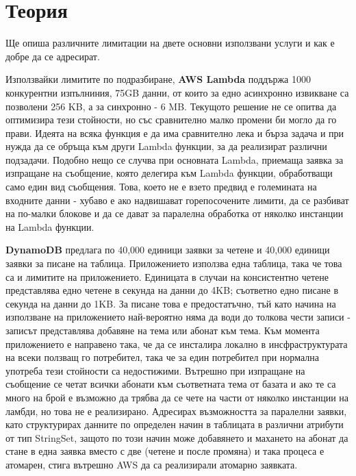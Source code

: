 \documentclass[12pt]{article}
\begin{document}
\section{Теория}
\noindent Ще опиша различните лимитации на двете основни използвани услуги и как е добре да се адресират.

\medskip

\noindent Използвайки лимитите по подразбиране, \textbf{AWS Lambda} поддържа 1000 конкурентни изпълниния,
75GB данни, от които за едно асинхронно извикване са позволени 256 KB, а за синхронно - 6 MB.
Текущото решение не се опитва да оптимизира тези стойности, но със сравнително малко промени би могло
да го прави. Идеята на всяка функция е да има сравнително лека и бърза задача и при нужда да се обръща
към други Lambda функции, за да реализират различни подзадачи. Подобно нещо се случва при основната
Lambda, приемаща заявка за изпращане на съобщение, която делегира към Lambda функции, обработващи само 
един вид съобщения. Това, което не е взето предвид е големината на входните данни - хубаво е ако надвишават
горепосочените лимити, да се разбиват на по-малки блокове и да се дават за паралелна обработка от няколко
инстанции на Lambda функции.

\noindent \textbf{DynamoDB} предлага по 40,000 единици заявки за четене и 40,000 единици заявки за писане
на таблица. Приложението използва една таблица, така че това са и лимитите на приложението. Единицата в
случаи на консистентно четене представлява едно четене в секунда на данни до 4KB; съответно едно писане
в секунда на данни до 1KB. За писане това е предостатъчно, тъй като начина на използване на приложението
най-вероятно няма да води до толкова чести записи - записът представлява добавяне на тема или абонат към тема.
Към момента приложението е направено така, че да се инсталира локално в инсфраструктурата на всеки ползващ го
потребител, така че за един потребител при нормална употреба тези стойности са недостижими.
Вътрешно при изпращане на съобщение се четат всички абонати към съответната тема от базата и ако те са
много на брой е възможно да трябва да се чете на части от няколко инстанции на ламбди, но това не е
реализирано. Адресирах възможността за паралелни заявки, като структурирах данните по определен начин в
таблицата в различни атрибути от тип StringSet, защото по този начин може добавянето и махането на 
абонат да стане в една заявка вместо с две (четене и после промяна) и така процеса е атомарен, стига
вътрешно AWS да са реализирали атомарно заявката.

\end{document}
